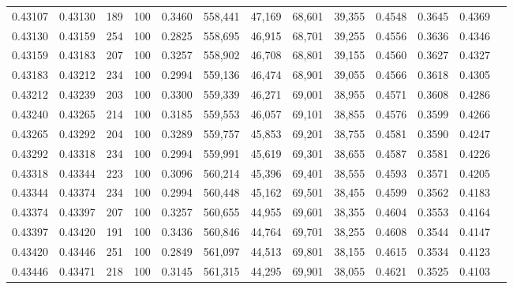 \begin{tabular}{rrrrrrrrrrrrr}
0.43107 & 0.43130 &    189 & 100 &                                     0.3460 & 558,441 &  47,169 &  68,601 &  39,355 & 0.4548 & 0.3645 & 0.4369 \\
0.43130 & 0.43159 &    254 & 100 &                                     0.2825 & 558,695 &  46,915 &  68,701 &  39,255 & 0.4556 & 0.3636 & 0.4346 \\
0.43159 & 0.43183 &    207 & 100 &                                     0.3257 & 558,902 &  46,708 &  68,801 &  39,155 & 0.4560 & 0.3627 & 0.4327 \\
0.43183 & 0.43212 &    234 & 100 &                                     0.2994 & 559,136 &  46,474 &  68,901 &  39,055 & 0.4566 & 0.3618 & 0.4305 \\
0.43212 & 0.43239 &    203 & 100 &                                     0.3300 & 559,339 &  46,271 &  69,001 &  38,955 & 0.4571 & 0.3608 & 0.4286 \\
0.43240 & 0.43265 &    214 & 100 &                                     0.3185 & 559,553 &  46,057 &  69,101 &  38,855 & 0.4576 & 0.3599 & 0.4266 \\
0.43265 & 0.43292 &    204 & 100 &                                     0.3289 & 559,757 &  45,853 &  69,201 &  38,755 & 0.4581 & 0.3590 & 0.4247 \\
0.43292 & 0.43318 &    234 & 100 &                                     0.2994 & 559,991 &  45,619 &  69,301 &  38,655 & 0.4587 & 0.3581 & 0.4226 \\
0.43318 & 0.43344 &    223 & 100 &                                     0.3096 & 560,214 &  45,396 &  69,401 &  38,555 & 0.4593 & 0.3571 & 0.4205 \\
0.43344 & 0.43374 &    234 & 100 &                                     0.2994 & 560,448 &  45,162 &  69,501 &  38,455 & 0.4599 & 0.3562 & 0.4183 \\
0.43374 & 0.43397 &    207 & 100 &                                     0.3257 & 560,655 &  44,955 &  69,601 &  38,355 & 0.4604 & 0.3553 & 0.4164 \\
0.43397 & 0.43420 &    191 & 100 &                                     0.3436 & 560,846 &  44,764 &  69,701 &  38,255 & 0.4608 & 0.3544 & 0.4147 \\
0.43420 & 0.43446 &    251 & 100 &                                     0.2849 & 561,097 &  44,513 &  69,801 &  38,155 & 0.4615 & 0.3534 & 0.4123 \\
0.43446 & 0.43471 &    218 & 100 &                                     0.3145 & 561,315 &  44,295 &  69,901 &  38,055 & 0.4621 & 0.3525 & 0.4103 \\

\end{tabular}
